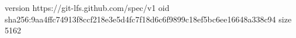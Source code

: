 version https://git-lfs.github.com/spec/v1
oid sha256:9aa4ffc74913f8ccf218e3e5d4fc7f18d6c6f9899c18ef5bc6ee16648a338c94
size 5162
